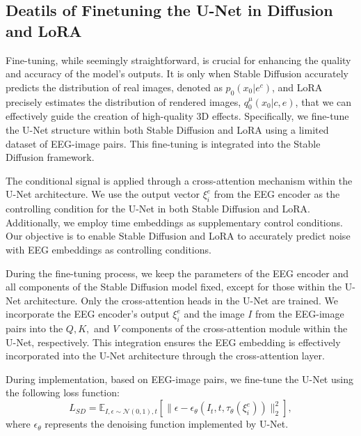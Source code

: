 \documentclass[conference]{IEEEtran}
\begin{document}
\subsection{Deatils of Finetuning the U-Net in Diffusion and LoRA}\label{s4}

Fine-tuning, while seemingly straightforward, is crucial for enhancing the quality and accuracy of the model's outputs. It is only when Stable Diffusion accurately predicts the distribution of real images, denoted as \( p_0(x_0|e^c) \), and LoRA precisely estimates the distribution of rendered images, \( q_0^\mu(x_0|c, e) \), that we can effectively guide the creation of high-quality 3D effects. Specifically, we fine-tune the U-Net structure within both Stable Diffusion and LoRA using a limited dataset of EEG-image pairs. This fine-tuning is integrated into the Stable Diffusion framework.

The conditional signal is applied through a cross-attention mechanism within the U-Net architecture. We use the output vector \( \xi_i^{e} \) from the EEG encoder as the controlling condition for the U-Net in both Stable Diffusion and LoRA. Additionally, we employ time embeddings as supplementary control conditions. Our objective is to enable Stable Diffusion and LoRA to accurately predict noise with EEG embeddings as controlling conditions.

During the fine-tuning process, we keep the parameters of the EEG encoder and all components of the Stable Diffusion model fixed, except for those within the U-Net architecture. Only the cross-attention heads in the U-Net are trained. We incorporate the EEG encoder's output \( \xi_i^{e} \) and the image \( I \) from the EEG-image pairs into the \( Q, K, \) and \( V \) components of the cross-attention module within the U-Net, respectively. This integration ensures the EEG embedding is effectively incorporated into the U-Net architecture through the cross-attention layer.

During implementation, based on EEG-image pairs, we fine-tune the U-Net using the following loss function:
\vspace{-4pt} 
\begin{equation}
L_{SD} = \mathbb{E}_{I, \epsilon \sim \mathcal{N}(0,1), t}\left[\| \epsilon - \epsilon_\theta\left(I_t, t, \tau_\theta({\xi_i^{e}})\right) \|_2^2\right],
\end{equation}
where $\epsilon_\theta$ represents the denoising function implemented by U-Net.
\end{document}
